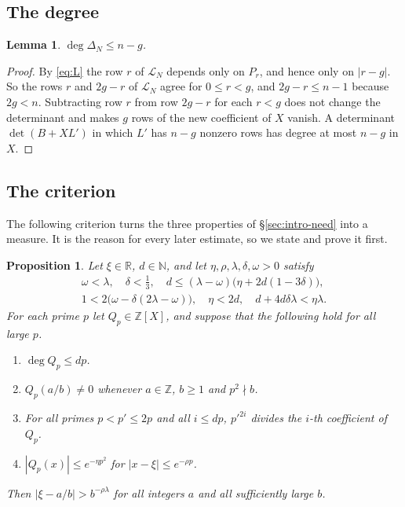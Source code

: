 \documentclass[11pt]{amsart}
\newtheorem{lemma}[theorem]{Lemma}
\newtheorem{proposition}[theorem]{Proposition}
\theoremstyle{definition}
\theoremstyle{remark}
\numberwithin{equation}{section}
\newcommand{\Z}{\mathbb Z}
\newcommand{\R}{\mathbb R}
\newcommand{\N}{\mathbb N}
\newcommand{\cL}{\mathcal L}
\begin{document}
\subsection{The degree}
\begin{lemma}\label{lem:degree}
$\deg\Delta_N\le n-g$.
\end{lemma}

\begin{proof}
By \eqref{eq:L} the row $r$ of $\cL_N$ depends only on $P_r$, and hence only on $|r-g|$. So the rows $r$
and $2g-r$ of $\cL_N$ agree for $0\le r<g$, and $2g-r\le n-1$ because $2g<n$. Subtracting row $r$ from row
$2g-r$ for each $r<g$ does not change the determinant and makes $g$ rows of the new coefficient of $X$
vanish. A determinant $\det(B+XL')$ in which $L'$ has $n-g$ nonzero rows has degree at most $n-g$ in $X$.
\end{proof}

\subsection{The criterion}\label{ssec:criterion}
The following criterion turns the three properties of \S\ref{sec:intro-need} into a measure. It is the
reason for every later estimate, so we state and prove it first.

\begin{proposition}\label{prop:criterion}
Let $\xi\in\R$, $d\in\N$, and let $\eta,\rho,\lambda,\delta,\omega>0$ satisfy
\begin{gather*}
 \omega<\lambda,\quad \delta<\tfrac13,\quad d\le(\lambda-\omega)\bigl(\eta+2d(1-3\delta)\bigr),\\
 1<2\bigl(\omega-\delta(2\lambda-\omega)\bigr),\quad \eta<2d,\quad d+4d\delta\lambda<\eta\lambda .
\end{gather*}
For each prime $p$ let $Q_p\in\Z[X]$, and suppose that the following hold for all large $p$.
\begin{enumerate}[label=(\alph*)]
\item $\deg Q_p\le dp$.
\item $Q_p(a/b)\ne0$ whenever $a\in\Z$, $b\ge1$ and $p^2\nmid b$.
\item For all primes $p<p'\le2p$ and all $i\le dp$, $p'^{2i}$ divides the $i$-th coefficient of $Q_p$.
\item $|Q_p(x)|\le e^{-\eta p^2}$ for $|x-\xi|\le e^{-\rho p}$.
\end{enumerate}
Then $|\xi-a/b|>b^{-\rho\lambda}$ for all integers $a$ and all sufficiently large $b$.
\end{proposition}
\end{document}
